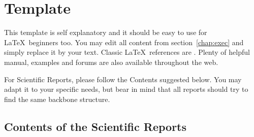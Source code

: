 \chapter{Template}

This template is self explanatory and it should be easy to use for \LaTeX\ beginners too. You may edit all content from section~\ref{chap:exec} and simply replace it by your text. Classic \LaTeX\ references are \cite{knuthwebsite,latexcompanion}. Plenty of helpful manual, examples and forums are also available throughout the web.

For Scientific Reports, please follow the Contents suggested below. You may adapt it to your specific needs, but bear in mind that all reports should try to find the same backbone structure.


\section{Contents of the Scientific Reports}

